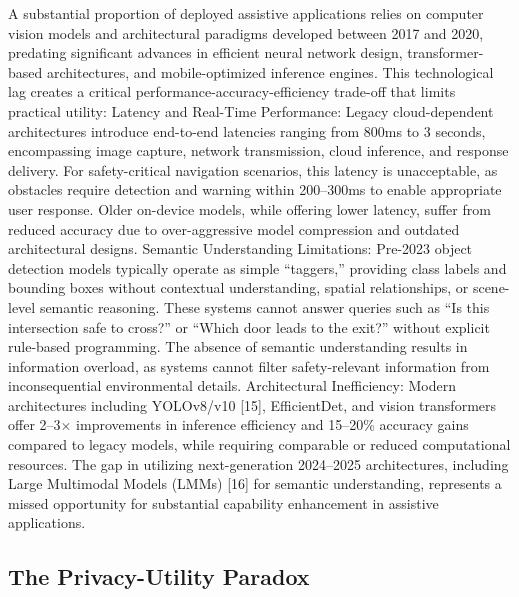 \documentclass[12pt,a4paper]{report}
\begin{document}
A substantial proportion of deployed assistive applications relies on computer vision models and architectural paradigms developed between 2017 and 2020, predating significant advances in efficient neural network design, transformer-based architectures, and mobile-optimized inference engines. This technological lag creates a critical performance-accuracy-efficiency trade-off that limits practical utility: Latency and Real-Time Performance: Legacy cloud-dependent architectures introduce end-to-end latencies ranging from 800ms to 3 seconds, encompassing image capture, network transmission, cloud inference, and response delivery. For safety-critical navigation scenarios, this latency is unacceptable, as obstacles require detection and warning within 200--300ms to enable appropriate user response. Older on-device models, while offering lower latency, suffer from reduced accuracy due to over-aggressive model compression and outdated architectural designs. Semantic Understanding Limitations: Pre-2023 object detection models typically operate as simple ``taggers,'' providing class labels and bounding boxes without contextual understanding, spatial relationships, or scene-level semantic reasoning. These systems cannot answer queries such as ``Is this intersection safe to cross?'' or ``Which door leads to the exit?'' without explicit rule-based programming. The absence of semantic understanding results in information overload, as systems cannot filter safety-relevant information from inconsequential environmental details. Architectural Inefficiency: Modern architectures including YOLOv8/v10 [15], EfficientDet, and vision transformers offer 2--3$\times$ improvements in inference efficiency and 15--20\% accuracy gains compared to legacy models, while requiring comparable or reduced computational resources. The gap in utilizing next-generation 2024--2025 architectures, including Large Multimodal Models (LMMs) [16] for semantic understanding, represents a missed opportunity for substantial capability enhancement in assistive applications.

\subsection{The Privacy-Utility Paradox}
\end{document}
